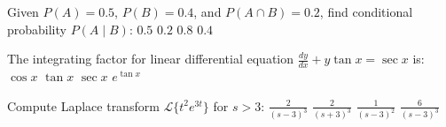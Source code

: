 \documentclass{article}
\begin{document}
\begin{question}
Given $P(A) = 0.5$, $P(B) = 0.4$, and $P(A \cap B) = 0.2$, find conditional probability $P(A \mid B)$:
  \CorrectChoice $0.5$
  \choice $0.2$
  \choice $0.8$
  \choice $0.4$
\end{question}

\begin{question}
The integrating factor for linear differential equation $\frac{dy}{dx} + y \tan x = \sec x$ is:
  \choice $\cos x$
  \choice $\tan x$
  \CorrectChoice $\sec x$
  \choice $e^{\tan x}$
\end{question}

\begin{question}
Compute Laplace transform $\mathcal{L}\{t^2 e^{3t}\}$ for $s > 3$:
  \CorrectChoice $\frac{2}{(s-3)^3}$
  \choice $\frac{2}{(s+3)^3}$
  \choice $\frac{1}{(s-3)^2}$
  \choice $\frac{6}{(s-3)^3}$
\end{question}
\end{document}
